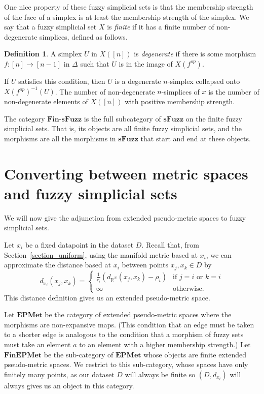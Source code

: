 \documentclass[a4paper,11pt,leqno]{article} \usepackage{amsmath}
\newcommand{\RR}{\mathbb{R}} \newcommand{\QQ}{\mathbb{Q}}
\theoremstyle{definition}
\newtheorem{defn}{Definition}
\begin{document}
One nice property of these fuzzy simplicial sets is that the membership
strength of the face of a simplex is at least the membership strength of the
simplex.
We say that a fuzzy simplicial set $X$ is \emph{finite} if it has a finite number
of non-degenerate simplices, defined as follows.
\begin{defn}
  A simplex $U$ in $X([n])$ is \emph{degenerate} if there is some morphism $f:
  [n]\to [n-1]$ in $\Delta$ such that $U$ is in the image of $X(f^{op})$.
\end{defn}
If $U$ satisfies this condition, then $U$ is a degenerate
$n$-simplex collapsed onto $X(f^{op})^{-1}(U)$.
The number of non-degenerate $n$-simplices of $x$ is the number of
non-degenerate elements of $X([n])$ with positive membership strength.

The category $\textbf{Fin-sFuzz}$ is the full subcategory of $\textbf{sFuzz}$
on the finite fuzzy simplicial sets.
That is, its objects are all finite fuzzy simplicial sets, and the morphisms
are all the morphisms in $\textbf{sFuzz}$ that start and end at these objects.

\section{Converting between metric spaces and fuzzy simplicial sets}
\label{section_adjunction}

We will now give the adjunction from extended pseudo-metric spaces to fuzzy
simplicial sets.

Let $x_i$ be a fixed datapoint in the dataset $D$.
Recall that, from Section~\ref{section_uniform}, using the manifold metric
based at $x_i$, we can approximate the distance based at $x_i$ between points
$x_j, x_k\in D$ by
$$d_{x_i}(x_j, x_k) = \begin{cases}
  \frac{1}{r_i}(d_{\RR^N}(x_j, x_k)-\rho_i) & \text{if $j = i$ or $k = i$}\\
\infty	& \text{otherwise.} \end{cases}$$
This distance definition gives us an extended pseudo-metric space.

Let $\textbf{EPMet}$ be the category of extended pseudo-metric spaces where the
morphisms are non-expansive maps.
(This condition that an edge must be taken to a shorter edge is analogous to
the condition that a morphism of fuzzy sets must take an element $a$ to an
element with a higher membership strength.)
Let $\textbf{FinEPMet}$ be the sub-category of $\textbf{EPMet}$ whose objects
are finite extended pseudo-metric spaces.
We restrict to this sub-category, whose spaces have only finitely many points,
as our dataset $D$ will always be finite so $(D, d_{x_i})$ will always gives us
an object in this category.
\end{document}
